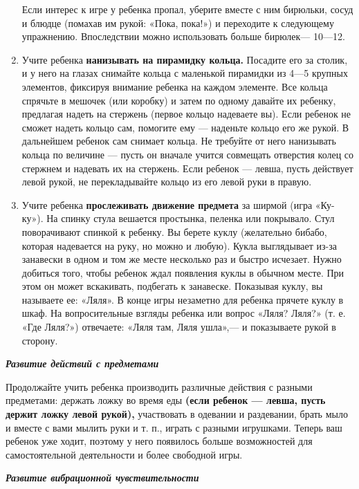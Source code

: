 \documentclass{book}
\renewcommand{\emph}[1]{\textit{#1}}
\begin{document}
\begin{enumerate}
Если интерес к игре у ребенка пропал, уберите вместе с ним бирюльки,
сосуд и блюдце (помахав им рукой: «Пока, пока!») и переходите к
следующему упражнению. Впоследствии можно использовать больше бирюлек---
10---12.

\item
  Учите ребенка \textbf{нанизывать на пирамидку кольца.} Посадите его за
  столик, и у него на глазах снимайте кольца с маленькой пирамидки из
  4---5 крупных элементов, фиксируя внимание ребенка на каждом элементе.
  Все кольца спрячьте в мешочек (или коробку) и затем по одному давайте
  их ребенку, предлагая надеть на стержень (первое кольцо надеваете вы).
  Если ребенок не сможет надеть кольцо сам, помогите ему --- наденьте
  кольцо его же рукой. В дальнейшем ребенок сам снимает кольца. Не
  требуйте от него нанизывать кольца по величине --- пусть он вначале
  учится совмещать отверстия колец со стержнем и надевать их на
  стержень. Если ребенок --- левша, пусть действует левой рукой, не
  перекладывайте кольцо из его левой руки в правую.


\item Учите ребенка \textbf{прослеживать движение предмета} за ширмой (игра
«Ку-ку»). На спинку стула вешается простынка, пеленка или покрывало.
Стул поворачивают спинкой к ребенку. Вы берете куклу (желательно бибабо,
которая надевается на руку, но можно и любую). Кукла выглядывает из-за
занавески в одном и том же месте несколько раз и быстро исчезает. Нужно
добиться того, чтобы ребенок ждал появления куклы в обычном месте. При
этом он может вскакивать, подбегать к занавеске. Показывая куклу, вы
называете ее: «Ляля». В конце игры незаметно для ребенка прячете куклу в
шкаф. На вопросительные взгляды ребенка или вопрос «Ляля? Ляля?» (т. е.
«Где Ляля?») отвечаете: «Ляля там, Ляля ушла»,--- и показываете рукой в
сторону.
  
\end{enumerate}


\emph{\textbf{Развитие действий с предметами}}

Продолжайте учить ребенка производить различные действия с разными
предметами: держать ложку во время еды \textbf{(если ребенок --- левша,
пусть держит ложку левой рукой),} участвовать в одевании и раздевании,
брать мыло и вместе с вами мылить руки и т. п., играть с разными
игрушками. Теперь ваш ребенок уже ходит, поэтому у него появилось больше
возможностей для самостоятельной деятельности и более свободной игры.

\emph{\textbf{Развитие вибрационной чувствительности}}
\end{document}
